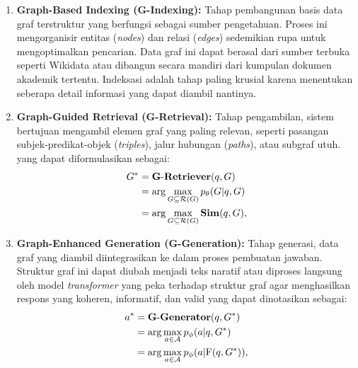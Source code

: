 \begin{enumerate}[label=\textbf{\Alph*.}, leftmargin=0.75cm]
    \item \textbf{Graph-Based Indexing (G-Indexing):} Tahap pembangunan basis data graf terstruktur yang berfungsi sebagai sumber pengetahuan. Proses ini mengorganisir entitas (\textit{nodes}) dan relasi (\textit{edges}) sedemikian rupa untuk mengoptimalkan pencarian. Data graf ini dapat berasal dari sumber terbuka seperti Wikidata \cite{wikidata} atau dibangun secara mandiri dari kumpulan dokumen akademik tertentu. Indeksasi adalah tahap paling krusial karena menentukan seberapa detail informasi yang dapat diambil nantinya.

    \item \textbf{Graph-Guided Retrieval (G-Retrieval):} Tahap pengambilan, sistem bertujuan mengambil elemen graf yang paling relevan, seperti pasangan subjek-predikat-objek (\textit{triples}), jalur hubungan (\textit{paths}), atau subgraf utuh. yang dapat diformulasikan sebagai:
          \begin{align}
              G^{*} & = \mathbf{G\text{-}Retriever}(q, G) \notag                                        \\
                    & = \arg\max_{G \subseteq \mathcal{R}(G)} p_{\theta}(G|q, G) \notag                 \\
                    & = \arg\max_{G \subseteq \mathcal{R}(G)} \mathbf{Sim}(q,G), \label{eq:g-retrieval}
          \end{align}

    \item \textbf{Graph-Enhanced Generation (G-Generation):} Tahap generasi, data graf yang diambil diintegrasikan ke dalam proses pembuatan jawaban. Struktur graf ini dapat diubah menjadi teks naratif atau diproses langsung oleh model \textit{transformer} yang peka terhadap struktur graf agar menghasilkan respons yang koheren, informatif, dan valid yang dapat dinotasikan sebagai:
          \begin{align}
              a^{*} & = \mathbf{G\text{-}Generator}(q,G^{*}) \notag                                         \\
                    & = \arg\max_{a \in \mathcal{A}} p_{\phi}(a|q,G^{*}) \notag                             \\
                    & = \arg\max_{a \in \mathcal{A}} p_{\phi}(a|\text{F}(q,G^{*})), \label{eq:g-generation}
          \end{align}
\end{enumerate}


